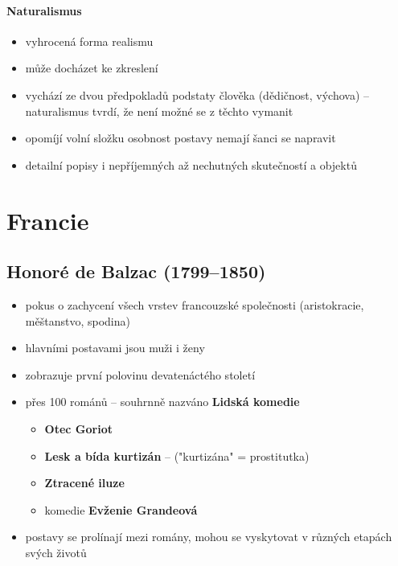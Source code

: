 \paragraph{Naturalismus}
\begin{itemize}
\item vyhrocená forma realismu
\item může docházet ke zkreslení
\item vychází ze dvou předpokladů podstaty člověka (dědičnost, výchova) -- naturalismus tvrdí, že není možné se z těchto vymanit
\item opomíjí volní složku osobnost \ra postavy nemají šanci se napravit
\item detailní popisy i nepříjemných až nechutných skutečností a objektů
\end{itemize}


\section{Francie}
\subsection{Honoré de Balzac (1799--1850)}
\begin{itemize}
\item pokus o zachycení všech vrstev francouzské společnosti (aristokracie, měštanstvo, spodina)
\item hlavními postavami jsou muži i ženy
\item zobrazuje první polovinu devatenáctého století
\item přes 100 románů -- souhrnně nazváno \textbf{Lidská komedie}
	\begin{itemize}
	\item \textbf{Otec Goriot}
	\item \textbf{Lesk a bída kurtizán} -- ("kurtizána" = prostitutka)
	\item \textbf{Ztracené iluze}
	\item komedie \textbf{Evženie Grandeová}
	\end{itemize}
\item postavy se prolínají mezi romány, mohou se vyskytovat v různých etapách svých životů
\end{itemize}

